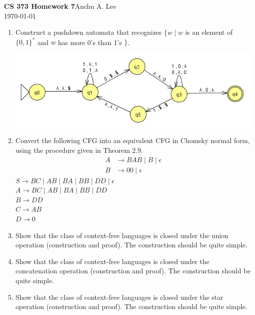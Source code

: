 \documentclass{article}
\begin{document}
    \noindent\textbf{CS 373 Homework 7}\hfill Anchu A. Lee\\
    \noindent\today\\
    \begin{enumerate}
        \item Construct a pushdown automata that recognizes $\{w \mid w $ is an element of $ \{0,1\}^* $ and $w$ has more 0's than 1's $ \}$.\\
        \begin{center}
            \includegraphics[scale=0.6]{machine1}
        \end{center}

        \item Convert the following CFG into an equivalent CFG in Chomsky normal form, using the procedure given in Theorem 2.9.
            \begin{align*}
                A&\rightarrow BAB\mid B\mid \epsilon\\
                B&\rightarrow 00 \mid \epsilon
            \end{align*}
            $S\rightarrow BC \mid AB \mid BA \mid BB \mid DD \mid \epsilon$\\
            $A\rightarrow BC\mid AB \mid BA \mid BB \mid DD$\\
            $B\rightarrow DD$\\
            $C\rightarrow AB$\\
            $D\rightarrow 0$
        \item Show that the class of context-free languages is closed under the union operation (construction and proof). The construction should be quite simple.

        \item Show that the class of context-free languages is closed under the concatenation operation (construction and proof). The construction should be quite simple.

        \item Show that the class of context-free languages is closed under the star operation (construction and proof). The construction should be quite simple.


\end{enumerate}
\end{document}
